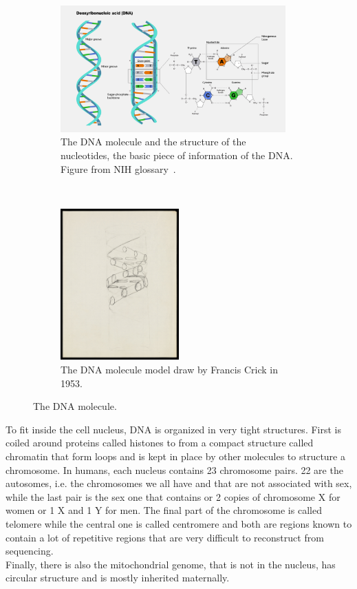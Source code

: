 \begin{figure}[h!]
	\centering
	\begin{subfigure}[b]{0.95\textwidth}
		\centering
		\includegraphics[width=0.95\textwidth]{figures/background/DNA_2024a.jpg}
		\caption[The DNA molecule]{The DNA molecule and the structure of the nucleotides, the basic piece of information of the DNA. Figure from NIH glossary~\cite{nih_dna}.} 
	\end{subfigure}%
	\\
	\begin{subfigure}[b]{0.75\textwidth}
		\centering
		\includegraphics[width=0.5\textwidth]{figures/background/DNA_sketch.jpg}
		\caption[The DNA sketch by Crick]{The DNA molecule model draw by Francis Crick in 1953.} 
	\end{subfigure}%
\caption{The DNA molecule.}
\label{fig:DNA}
\end{figure}

To fit inside the cell nucleus, DNA is organized in very tight structures. First is coiled around proteins called histones to from a compact structure called chromatin that form loops and is kept in place by other molecules to structure a chromosome. In humans, each nucleus contains 23 chromosome pairs. 22 are the autosomes, i.e. the chromosomes we all have and that are not associated with sex, while the last pair is the sex one that contains or 2 copies of chromosome X for women or 1 X and 1 Y for men. The final part of the chromosome is called telomere while the central one is called centromere and both are regions known to contain a lot of repetitive regions that are very difficult to reconstruct from sequencing. \\ Finally, there is also the mitochondrial genome, that is not in the nucleus, has circular structure and is mostly inherited maternally.

